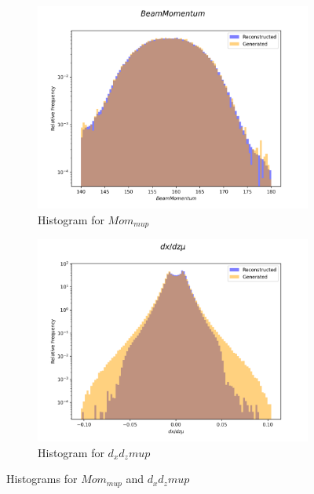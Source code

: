 \documentclass{article}
\begin{document}
\begin{figure}[H]
    \centering
    \begin{subfigure}[b]{0.45\textwidth}
        \includegraphics[width=\textwidth]{graphs/incl_Beam_Momentum.png}
        \caption{Histogram for $Mom_{mup}$}
        \label{fig:incl_Momentum_mup}
    \end{subfigure}
    \hfill
    \begin{subfigure}[b]{0.45\textwidth}
        \includegraphics[width=\textwidth]{graphs/incl_dx_dz_mu.png}
        \caption{Histogram for $d_xd_zmup$}
        \label{fig:incl_Angle_mu_1}
    \end{subfigure}
    \caption{Histograms for $Mom_{mup}$ and $d_xd_zmup$}
\end{figure}
\end{document}
